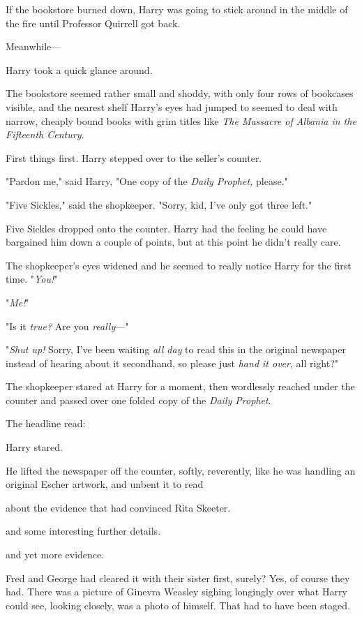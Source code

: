 If the bookstore burned down, Harry was going to stick around in the middle of
the fire until Professor Quirrell got back.

Meanwhile\mbox{---}

Harry took a quick glance around.

The bookstore seemed rather small and shoddy, with only four rows of bookcases
visible, and the nearest shelf Harry's eyes had jumped to seemed to deal with
narrow, cheaply bound books with grim titles like \emph{The Massacre of Albania
in the Fifteenth Century.}

First things first. Harry stepped over to the seller's counter.

"Pardon me," said Harry, "One copy of the \emph{Daily Prophet,} please."

"Five Sickles," said the shopkeeper. "Sorry, kid, I've only got three left."

Five Sickles dropped onto the counter. Harry had the feeling he could have
bargained him down a couple of points, but at this point he didn't really care.

The shopkeeper's eyes widened and he seemed to really notice Harry for the
first time. "\emph{You!}"

"\emph{Me!}"

"Is it \emph{true?} Are you \emph{really}\mbox{---}"

"\emph{Shut up!} Sorry, I've been waiting \emph{all day} to read this in the
original newspaper instead of hearing about it secondhand, so please just
\emph{hand it over}, all right?"

The shopkeeper stared at Harry for a moment, then wordlessly reached under the
counter and passed over one folded copy of the \emph{Daily Prophet}.

The headline read:


Harry stared.

He lifted the newspaper off the counter, softly, reverently, like he was
handling an original Escher artwork, and unbent it to read{\el}

{\el} about the evidence that had convinced Rita Skeeter.

{\el} and some interesting further details.

{\el} and yet more evidence.

Fred and George had cleared it with their sister first, surely? Yes, of course
they had. There was a picture of Ginevra Weasley sighing longingly over what
Harry could see, looking closely, was a photo of himself. That had to have been
staged.

